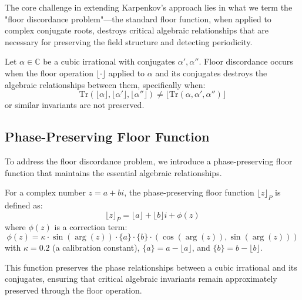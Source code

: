 The core challenge in extending Karpenkov's approach lies in what we term the "floor discordance problem"—the standard floor function, when applied to complex conjugate roots, destroys critical algebraic relationships that are necessary for preserving the field structure and detecting periodicity.

\begin{definition}
Let $\alpha \in \mathbb{C}$ be a cubic irrational with conjugates $\alpha', \alpha''$. Floor discordance occurs when the floor operation $\lfloor\cdot\rfloor$ applied to $\alpha$ and its conjugates destroys the algebraic relationships between them, specifically when:
\begin{equation}
\text{Tr}(\lfloor\alpha\rfloor, \lfloor\alpha'\rfloor, \lfloor\alpha''\rfloor) \neq \lfloor\text{Tr}(\alpha, \alpha', \alpha'')\rfloor
\end{equation}
or similar invariants are not preserved.
\end{definition}

\subsection{Phase-Preserving Floor Function}

To address the floor discordance problem, we introduce a phase-preserving floor function that maintains the essential algebraic relationships.

\begin{definition}
For a complex number $z = a + bi$, the phase-preserving floor function $\lfloor z \rfloor_P$ is defined as:
\begin{equation}
\lfloor z \rfloor_P = \lfloor a \rfloor + \lfloor b \rfloor i + \phi(z)
\end{equation}
where $\phi(z)$ is a correction term:
\begin{equation}
\phi(z) = \kappa \cdot \sin(\arg(z)) \cdot \{a\} \cdot \{b\} \cdot (\cos(\arg(z)), \sin(\arg(z)))
\end{equation}
with $\kappa = 0.2$ (a calibration constant), $\{a\} = a - \lfloor a \rfloor$, and $\{b\} = b - \lfloor b \rfloor$.
\end{definition}

This function preserves the phase relationships between a cubic irrational and its conjugates, ensuring that critical algebraic invariants remain approximately preserved through the floor operation.

